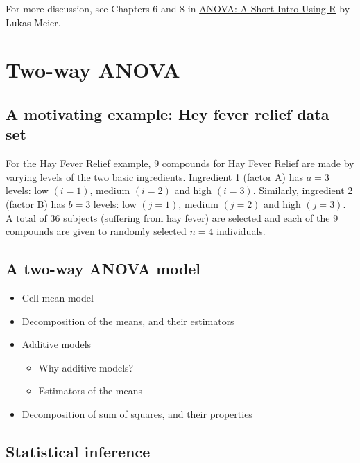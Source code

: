 \documentclass[12pt,]{book}
\providecommand{\tightlist}{%
  \setlength{\itemsep}{0pt}\setlength{\parskip}{0pt}}
\begin{document}
For more discussion, see Chapters 6 and 8 in
\href{https://stat.ethz.ch/~meier/teaching/anova/}{ANOVA: A Short Intro
Using R} by Lukas Meier.

\section{Two-way ANOVA}\label{two-way-anova}

\subsection{A motivating example: Hey fever relief data
set}\label{a-motivating-example-hey-fever-relief-data-set}

For the Hay Fever Relief example, 9 compounds for Hay Fever Relief are
made by varying levels of the two basic ingredients. Ingredient 1
(factor A) has \(a = 3\) levels: low \((i = 1)\), medium \((i = 2)\) and
high \((i = 3)\). Similarly, ingredient 2 (factor B) has \(b = 3\)
levels: low \((j = 1)\), medium \((j = 2)\) and high \((j = 3)\). A
total of 36 subjects (suffering from hay fever) are selected and each of
the 9 compounds are given to randomly selected \(n = 4\) individuals.

\subsection{A two-way ANOVA model}\label{a-two-way-anova-model}

\begin{itemize}
\tightlist
\item
  Cell mean model
\item
  Decomposition of the means, and their estimators
\item
  Additive models

  \begin{itemize}
  \tightlist
  \item
    Why additive models?
  \item
    Estimators of the means
  \end{itemize}
\item
  Decomposition of sum of squares, and their properties
\end{itemize}

\subsection{Statistical inference}\label{statistical-inference-1}
\end{document}
